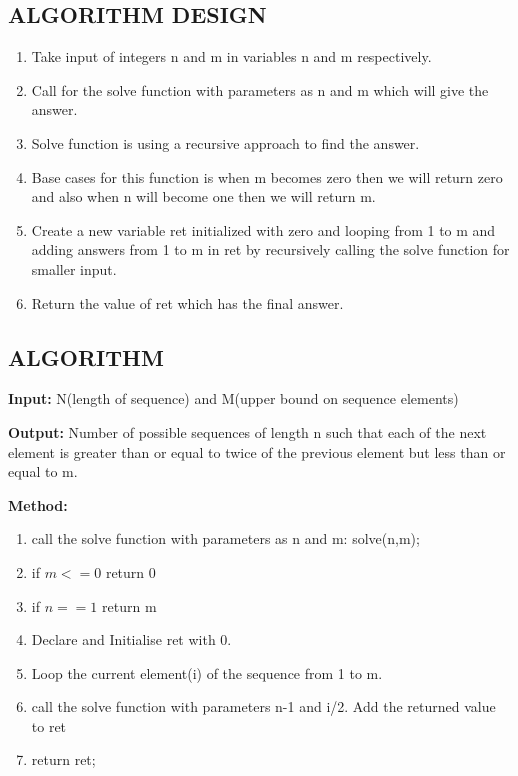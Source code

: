 \documentclass[conference]{IEEEtran}
\begin{document}
\subsection{ALGORITHM DESIGN}
\begin{enumerate}
\item Take input of integers n and m in variables n and m respectively.

\item Call for the solve function with parameters as n and m which will give the answer.

\item Solve function is using a recursive approach to find the answer.

\item Base cases for this function is when m becomes zero then we will return zero and also when n will become one then we will return m.

\item Create a new variable ret initialized with zero and looping from 1 to m and adding answers from 1 to m in ret by recursively calling the solve function for smaller input.

\item Return the value of ret which has the final answer.

\end{enumerate}

\subsection{ALGORITHM }

\textbf{Input:} N(length of sequence) and M(upper bound on sequence elements)

\textbf{Output:} Number of possible sequences of length n such that each of the next element is greater than or equal to twice of the previous element but less than or equal to m.

\textbf{Method:}

\begin{enumerate}
    \item call the solve function with parameters as n and m: solve(n,m);
    \item if $m<=0$ return 0
    \item if $n==1$ return m
    \item Declare and Initialise ret with 0.
    \item Loop the current element(i) of the sequence from 1 to m.
    \setlength{\itemindent}{+.5in}
    \item call the solve function with parameters n-1 and i/2. Add the returned value to ret
    \setlength{\itemindent}{0in}
	\item return ret;
	
\end{enumerate}
\end{document}
